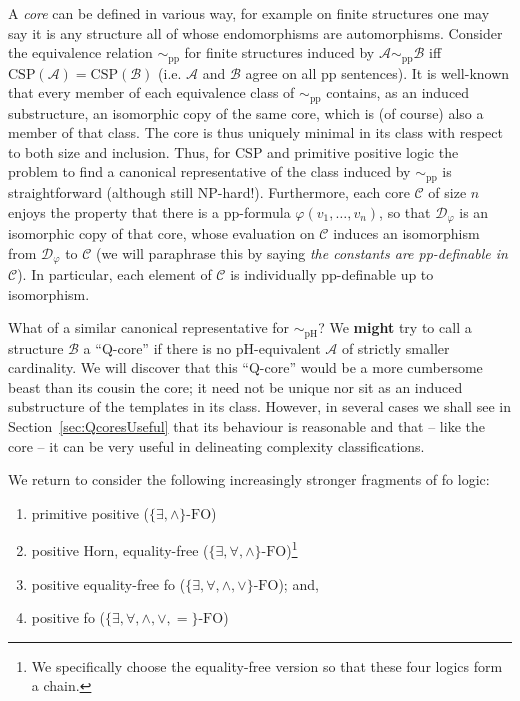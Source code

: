 \documentclass{LMCS}
\newcommand{\csplogic}{\ensuremath{\{\exists, \wedge \}
    \mbox{-}\mathrm{FO}}}
\newcommand{\qcsplogic}{\ensuremath{\{\exists, \forall, \wedge \}
    \mbox{-}\mathrm{FO}}}
\newcommand{\mylogic}{\ensuremath{\{\exists, \forall, \wedge,\vee \} \mbox{-}\mathrm{FO}}}
\newcommand{\posFO}{\ensuremath{\{\exists, \forall, \wedge,\vee,= \}
    \mbox{-}\mathrm{FO}}}
\renewcommand{\phi}{\varphi}
\begin{document}
A \emph{core} can be defined in various way, for example on finite structures one may say it is any structure all of whose endomorphisms are automorphisms. Consider the equivalence relation $\sim_{\mathrm{pp}}$ for finite structures induced by $\mathcal{A} \sim_{\mathrm{pp}} \mathcal{B}$ iff  $\mathrm{CSP}(\mathcal{A}) = \mathrm{CSP}(\mathcal{B})$ (\mbox{i.e.} $\mathcal{A}$ and $\mathcal{B}$ agree on all pp sentences). It is well-known that every member of each equivalence class of  $\sim_{\mathrm{pp}}$ contains, as an induced substructure, an isomorphic copy of the same core, which is (of course) also a member of that class. The core is thus uniquely minimal in its class with respect to both size and inclusion. Thus, for CSP and primitive positive logic the problem to find a canonical representative of the class induced by $\sim_{\mathrm{pp}}$ is straightforward (although still NP-hard!). Furthermore, each core $\mathcal{C}$ of size $n$ enjoys the property that there is a pp-formula $\phi(v_1,\ldots,v_n)$, so that $\mathcal{D}_\phi$ is an  isomorphic copy of that core, whose evaluation on $\mathcal{C}$ induces an isomorphism from $\mathcal{D}_\phi$ to $\mathcal{C}$ (we will paraphrase this by saying \emph{the constants are pp-definable in $\mathcal{C}$}). In particular, each element of $\mathcal{C}$ is individually pp-definable up to isomorphism.

What of a similar canonical representative for  $\sim_{\mathrm{pH}}$? We \textbf{might} try to call a structure $\mathcal{B}$ a ``Q-core'' if there is no pH-equivalent $\mathcal{A}$ of strictly smaller cardinality. We will discover that this ``Q-core'' would be a more cumbersome beast than its cousin the core; it need not be unique nor sit as an induced substructure of the templates in its class. However, in several cases we shall see in Section~\ref{sec:QcoresUseful} that its behaviour is reasonable and that -- like the core -- it can be very useful in delineating complexity classifications. 

We return to consider the following increasingly stronger fragments of fo logic:
\begin{enumerate}
\item primitive positive ($\csplogic$)
\item positive Horn, equality-free ($\qcsplogic$)\footnote{We specifically choose the equality-free version so that these four logics form a chain.}
\item positive equality-free fo (\mylogic); and,
\item positive fo (\posFO)
\end{enumerate}
\end{document}

